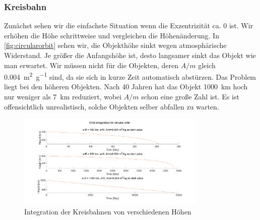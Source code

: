 \documentclass{article}
\begin{document}
\subsubsection{Kreisbahn}
Zunächst sehen wir die einfachste Situation wenn die Exzentrizität ca. $0$ ist. Wir erhöhen die Höhe schrittweise und vergleichen die Höhenänderung. In \autoref{fig:circularorbit} sehen wir, die Objekthöhe sinkt wegen atmosphärische Widerstand. Je größer die Anfangshöhe ist, desto langsamer sinkt das Objekt wie man erwartet. Wir müssen nicht für die Objekten, deren $A/m$ gleich \SI{0,004}{\meter\squared \per \gram} sind, da sie sich in kurze Zeit automatisch abstürzen. Das Problem liegt bei den höheren Objekten. Nach 40 Jahren hat das Objekt \SI{1000}{\kilo\meter} hoch nur weniger als \SI{7}{\kilo\meter} reduziert, wobei $A/m$ schon eine große Zahl ist. Es ist offensichtlich unrealistisch, solche Objekten selber abfallen zu warten.
\begin{figure}[ht]\centering 
	\includegraphics[width=0.8\textwidth]{images/inte_e0.png}
	\caption{Integration der Kreisbahnen von verschiedenen Höhen}
	\label{fig:circularorbit}
\end{figure}
\end{document}
